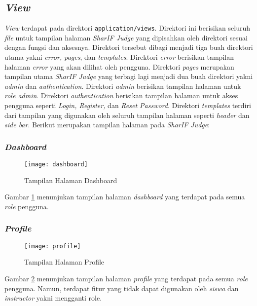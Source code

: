 \subsection{\textit{View}}
\textit{View} terdapat pada direktori \texttt{application/views}. Direktori ini berisikan seluruh \textit{file} untuk tampilan halaman \textit{SharIF Judge} yang dipisahkan oleh direktori sesuai dengan fungsi dan aksesnya. Direktori tersebut dibagi menjadi tiga buah direktori utama yakni \textit{error, pages}, dan \textit{templates}. Direktori \textit{error} berisikan tampilan halaman \textit{error} yang akan dilihat oleh pengguna. Direktori \textit{pages} merupakan tampilan utama \textit{SharIF Judge} yang terbagi lagi menjadi dua buah direktori yakni \textit{admin} dan \textit{authentication}. Direktori \textit{admin} berisikan tampilan halaman untuk \textit{role admin}. Direktori \textit{authentication} berisikan tampilan halaman untuk akses pengguna seperti \textit{Login, Register,} dan \textit{Reset Password}. Direktori \textit{templates} terdiri dari tampilan yang digunakan oleh seluruh tampilan halaman seperti \textit{header} dan \textit{side bar}. Berikut merupakan tampilan halaman pada \textit{SharIF Judge}:

\subsubsection{\textit{Dashboard}}
\begin{figure}[H]
	\centering  
	\texttt{[image: dashboard]}  
	\caption[Tampilan Halaman \textit{Dashboard}]{Tampilan Halaman Dashboard} 
	\label{fig:dashboard} 
\end{figure} 

Gambar \ref{fig:dashboard} menunjukan tampilan halaman \textit{dashboard} yang terdapat pada semua \textit{role} pengguna.
\subsubsection{\textit{Profile}}
\begin{figure}[H]
	\centering  
	\texttt{[image: profile]}  
	\caption[Tampilan Halaman \textit{Profile}]{Tampilan Halaman Profile} 
	\label{fig:profile} 
\end{figure}

Gambar \ref{fig:profile} menunjukan tampilan halaman \textit{profile} yang terdapat pada semua \textit{role} pengguna. Namun, terdapat fitur yang tidak dapat digunakan oleh \textit{siswa} dan \textit{instructor} yakni mengganti role.

